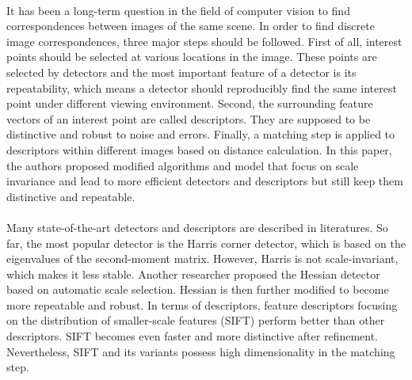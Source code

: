 \documentclass[11pt, oneside]{article}   	%
\begin{document}
\paragraph{}It has been a long-term question in the field of computer vision to find correspondences between images of the same scene. In order to find discrete image correspondences, three major steps should be followed. First of all, interest points should be selected at various locations in the image. These points are selected by detectors and the most important feature of a detector is its repeatability, which means a detector should reproducibly find the same interest point under different viewing environment. Second, the surrounding feature vectors of an interest point are called descriptors. They are supposed to be distinctive and robust to noise and errors. Finally, a matching step is applied to descriptors within different images based on distance calculation. In this paper, the authors proposed modified algorithms and model that focus on scale invariance and lead to more efficient detectors and descriptors but still keep them distinctive and repeatable.
\paragraph{}Many state-of-the-art detectors and descriptors are described in literatures. So far, the most popular detector is the Harris corner detector, which is based on the eigenvalues of the second-moment matrix. However, Harris is not scale-invariant, which makes it less stable. Another researcher proposed the Hessian detector based on automatic scale selection. Hessian is then further modified to become more repeatable and robust. In terms of descriptors, feature descriptors focusing on the distribution of smaller-scale features (SIFT) perform better than other descriptors. SIFT becomes even faster and more distinctive after refinement. Nevertheless, SIFT and its variants possess high dimensionality in the matching step.
\end{document}
